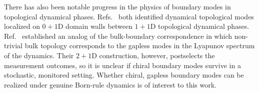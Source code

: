 \documentclass[aps,prb,10pt,twocolumn,superscriptaddress,longbibliography,floatfix]{revtex4-2}
\newcommand{\claudeadd}[1]{{\color{orange}#1}}
\begin{document}
There has also been notable progress in the physics of boundary modes in topological dynamical phases.  Refs.~\cite{PanShapourianJian2025, Oshima2025} both identified dynamical topological modes localized on $0+1$D domain walls between $1+1$D topological dynamical phases. Ref.~\cite{XiaoKawabata2026}
established an analog of the bulk-boundary correspondence in which non-trivial bulk topology corresponds to the gapless modes in the Lyapunov spectrum of the dynamics. Their $2+1$D construction, however, postselects the measurement outcomes, so it is unclear if chiral boundary modes survive in a stochastic, monitored setting. Whether chiral, gapless boundary modes can be realized under genuine Born-rule dynamics is of interest to this work.



\end{document}

